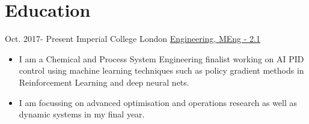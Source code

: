 \documentclass[letterpaper]{twentysecondcv} %
\begin{document}
\makeprofile %


\section{Education}
\begin{twenty} %
\twentyitem
    	{Oct. 2017-}
		{Present}
        {Imperial College London}
        {\href{http://www.imperial.ac.uk}{Engineering, MEng - 2.1}}
        {}
        {\vspace{-2mm} \begin{itemize}
            \item I am a Chemical and Process System Engineering finalist working on AI PID control using machine learning techniques such as policy gradient methods in Reinforcement Learning and deep neural nets.
            \item I am focussing on advanced optimisation and operations research as well as dynamic systems in my final year. 
        \end{itemize}%
        }
        \\


\end{twenty}
\end{document}
